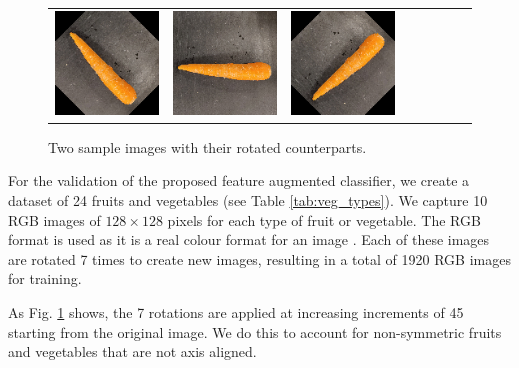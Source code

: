 \begin{figure}[tp]
\begin{center}
\begin{tabular}{c|ccccccc}
			\includegraphics[scale=0.4]{./img/carrot_5.png} &
			\includegraphics[scale=0.4]{./img/carrot_6.png} &
			\includegraphics[scale=0.4]{./img/carrot_7.png} \\
		\end{tabular}
		\label{tab:veg_types}
	\end{center}
	\caption{Two sample images with their rotated counterparts.}
	\label{fig:veg_rotations}
\end{figure}
\egroup

For the validation of the proposed feature augmented classifier, we create a dataset of 24 fruits and vegetables (see Table \ref{tab:veg_types}). We capture 10 RGB images of $128 \times 128$ pixels for each type of fruit or vegetable. The RGB format is used as it is a real colour format for an image \cite{b3_1}. Each of these images are rotated 7 times to create new images, resulting in a total of 1920 RGB images for training.

As Fig. \ref{fig:veg_rotations} shows, the 7 rotations are applied at increasing increments of 45\degree{} starting from the original image. We do this to account for non-symmetric fruits and vegetables that are not axis aligned.

